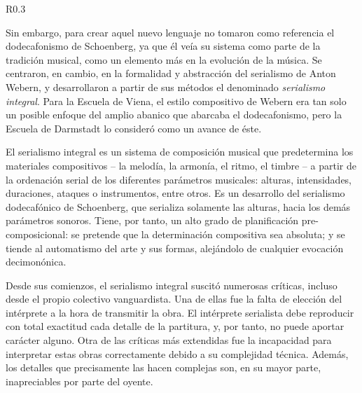 	\begin{wrapfigure}{R}{0.3\textwidth}
		\captionsetup{justification=centering, font=footnotesize}
		\vspace{-0.5cm}
	\end{wrapfigure}
    Sin embargo, para crear aquel nuevo lenguaje no tomaron como referencia el dodecafonismo de Schoenberg, ya que él veía su sistema como parte de la tradición musical, como un elemento más en la evolución de la música. Se centraron, en cambio, en la formalidad y abstracción del serialismo de Anton Webern, y desarrollaron a partir de sus métodos el denominado \emph{serialismo integral}. Para la Escuela de Viena, el estilo compositivo de Webern era tan solo un posible enfoque del amplio abanico que abarcaba el dodecafonismo, pero la Escuela de Darmstadt lo consideró como un avance de éste.
	
	El serialismo integral es un sistema de composición musical que predetermina los materiales compositivos -- la melodía, la armonía, el ritmo, el timbre -- a partir de la ordenación serial de los diferentes parámetros musicales: alturas, intensidades, duraciones, ataques o instrumentos, entre otros. Es un desarrollo del serialismo dodecafónico de Schoenberg, que serializa solamente las alturas, hacia los demás parámetros sonoros. Tiene, por tanto, un alto grado de planificación pre-composicional: se pretende que la determinación compositiva sea absoluta; y se tiende al automatismo del arte y sus formas, alejándolo de cualquier evocación decimonónica.

	Desde sus comienzos, el serialismo integral suscitó numerosas críticas, incluso desde el propio colectivo vanguardista. Una de ellas fue la falta de elección del intérprete a la hora de transmitir la obra. El intérprete serialista debe reproducir con total exactitud cada detalle de la partitura, y, por tanto, no puede aportar carácter alguno. Otra de las críticas más extendidas fue la incapacidad para interpretar estas obras correctamente debido a su complejidad técnica. Además, los detalles que precisamente las hacen complejas son, en su mayor parte, inapreciables por parte del oyente.


